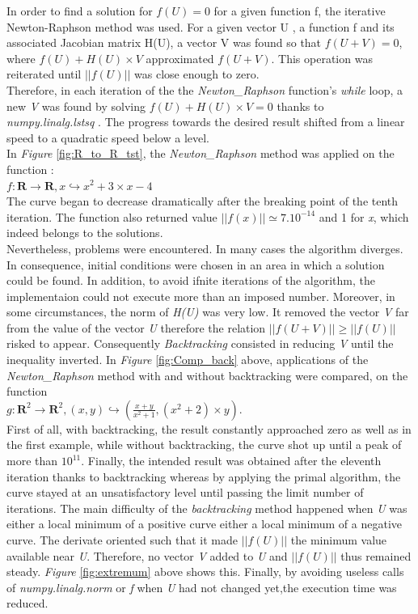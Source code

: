 \documentclass{article}
\begin{document}
In order to find a solution for $f(U) = 0$ for a given function f, the iterative Newton-Raphson method was used. For a given vector U , a function f and its associated Jacobian matrix H(U), a vector V was found so that $f(U + V) = 0$, where $f(U) + H(U) \times V$ approximated $f(U + V)$. This operation was reiterated until $||f(U)||$ was close enough to zero.
\\Therefore, in each iteration of the the \emph{Newton\_Raphson} function's \emph{while} loop, a new \emph{V} was found by solving $f(U) + H(U) \times V = 0$ thanks to \emph{numpy.linalg.lstsq} . The progress towards the desired result shifted from a linear speed to a quadratic speed below a level. 
\\In \emph{Figure} \ref{fig:R_to_R_tst}, the \emph{Newton\_Raphson} method was applied on the function :
\\$f : \mathbf{R} \longrightarrow \mathbf{R} , x \hookrightarrow x^2 + 3 \times x - 4$
\\The curve began to decrease dramatically after the breaking point of the tenth iteration. The function also returned value $||f(x)|| \simeq 7.10^{-14}$ and 1 for \emph{x}, which indeed belongs to the solutions.
\\Nevertheless, problems were encountered. In many cases the algorithm diverges. In consequence, initial conditions were chosen in an area in which a solution could be found. In addition, to avoid ifnite iterations of the algorithm, the implementaion could not execute more than an imposed number.
Moreover, in some circumstances, the norm of \emph{H(U)} was very low. It removed the vector \emph{V} far from the value of the vector \emph{U} therefore the relation $||f(U + V)|| \geq ||f(U)||$ risked to appear. Consequently \emph{Backtracking} consisted in reducing \emph{V} until the inequality inverted. In \emph{Figure} \ref{fig:Comp_back} above, applications of the \emph{Newton\_Raphson} method with and without backtracking were compared, on the function
\\$g : \mathbf{R}^2 \longrightarrow \mathbf{R}^2 , (x,y) \hookrightarrow (\frac{x + y}{x^2 + 1},(x^2 + 2) \times y)$.
\\First of all, with backtracking, the result constantly approached zero as well as in the first example, while without backtracking, the curve shot up until a peak of more than $10^{11}$. Finally, the intended result was obtained after the eleventh iteration thanks to backtracking whereas by applying the primal algorithm, the curve stayed at an unsatisfactory level until passing the limit number of iterations.
The main difficulty of the \emph{backtracking} method happened when \emph{U} was either a local minimum of a positive curve either a local minimum of a negative curve. The derivate oriented such that it made $||f(U)||$ the minimum value available near \emph{U}. Therefore, no vector \emph{V} added to \emph{U} and $||f(U)||$ thus remained steady. \emph{Figure} \ref{fig:extremum} above shows this.
Finally, by avoiding useless calls of \emph{numpy.linalg.norm} or \emph{f} when \emph{U} had not changed yet,the execution time was reduced.
\end{document}
